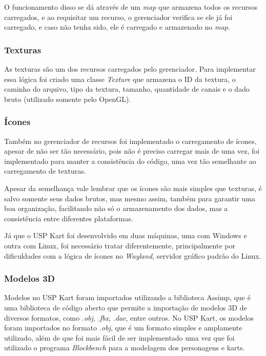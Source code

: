 O funcionamento disso se dá através de um \textit{map} que armazena todos os recursos carregados, e ao requisitar um recurso, o gerenciador verifica se ele já foi carregado, e caso não tenha sido, ele é carregado e armazenado no \textit{map}.

\subsubsection{Texturas}

As texturas são um dos recursos carregados pelo gerenciador. Para implementar essa lógica foi criado uma classe \textit{Texture} que armazena o ID da textura, o caminho do arquivo, tipo da textura, tamanho, quantidade de canais e o dado bruto (utilizado somente pelo OpenGL).

\subsubsection{Ícones}

Também no gerenciador de recursos foi implementado o carregamento de ícones, apesar de não ser tão necessário, pois não é preciso carregar mais de uma vez, foi implementado para manter a consistência do código, uma vez tão semelhante ao carregamento de texturas.

Apesar da semelhança vale lembrar que os ícones são mais simples que texturas, é salvo somente seus dados brutos, mas mesmo assim, também para garantir uma boa organização, facilitando não só o armazenamento dos dados, mas a consistência entre diferentes plataformas. 

Já que o USP Kart foi desenvolvido em duas máquinas, uma com Windows e outra com Linux, foi necessário tratar diferentemente, principalmente por dificuldades com a lógica de ícones no \textit{Wayland}, servidor gráfico padrão do Linux.

\subsubsection{Modelos 3D}

Modelos no USP Kart foram importados utilizando a biblioteca Assimp, que é uma biblioteca de código aberto que permite a importação de modelos 3D de diversos formatos, como \textit{.obj}, \textit{.fbx}, \textit{.dae}, entre outros. No USP Kart, os modelos foram importados no formato \textit{.obj}, que é um formato simples e amplamente utilizado, além de que foi mais fácil de ser implementado uma vez que foi utilizado o programa \textit{Blockbench} para a modelagem dos personagens e karts.

